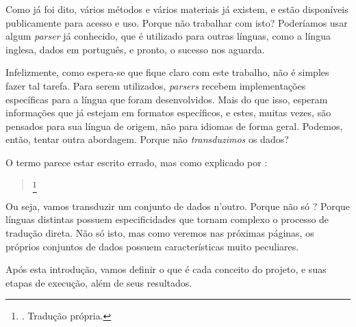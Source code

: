 Como já foi dito, vários métodos e vários materiais já existem, e estão disponíveis publicamente para acesso e uso. Porque não trabalhar com isto? Poderíamos usar algum \textit{parser} 
já conhecido, que é utilizado para outras línguas, como a língua inglesa,
dados em português, e pronto, o sucesso nos aguarda.

Infelizmente, como espera-se que fique claro com este trabalho, não é simples fazer tal tarefa. Para serem utilizados, \textit{parsers} recebem implementações específicas para a língua que foram desenvolvidos. Mais do que isso, esperam informações que já estejam em formatos específicos, e estes, muitas vezes, são pensados para sua língua de origem, não para idiomas de forma geral.
Podemos, então, tentar outra abordagem.
Porque não \textit{transduzimos} os dados?
    

O termo  parece estar escrito errado, mas como explicado por :
\begin{quote}
    \footnote{. Tradução própria.}
\end{quote}
Ou seja, vamos transduzir um conjunto de dados n’outro. Porque não só ? 
Porque línguas distintas possuem especificidades que tornam complexo o processo de tradução direta. Não só isto, mas como veremos nas próximas páginas, os próprios conjuntos de dados possuem características muito peculiares.

Após esta introdução, vamos definir o que é cada conceito do projeto, e suas etapas de execução, além de seus resultados.

